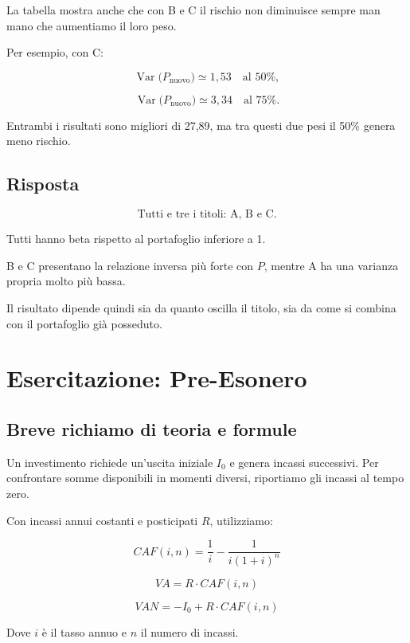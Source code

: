 \medskip

\noindent La tabella mostra anche
che con B e C il rischio
non diminuisce sempre
man mano che aumentiamo il loro peso.

\noindent Per esempio, con C:

\[
\operatorname{Var}\bigl(P_{\text{nuovo}}\bigr)
\simeq1{,}53
\quad\text{al }50\%,
\]

\[
\operatorname{Var}\bigl(P_{\text{nuovo}}\bigr)
\simeq3{,}34
\quad\text{al }75\%.
\]

\noindent Entrambi i risultati
sono migliori di 27,89,
ma tra questi due pesi
il 50\% genera meno rischio.


\subsection*{Risposta}

\[
\boxed{
\text{Tutti e tre i titoli: A, B e C.}
}
\]

\noindent Tutti hanno beta rispetto al portafoglio
inferiore a 1.

\noindent B e C presentano
la relazione inversa più forte con $P$,
mentre A ha una varianza propria
molto più bassa.

\noindent Il risultato dipende quindi
sia da quanto oscilla il titolo,
sia da come si combina
con il portafoglio già posseduto.
\newpage

\section{Esercitazione: Pre-Esonero}

\subsection*{Breve richiamo di teoria e formule}

Un investimento richiede un'uscita iniziale $I_0$ e genera
incassi successivi. Per confrontare somme disponibili
in momenti diversi, riportiamo gli incassi al tempo zero.

\noindent Con incassi annui costanti e posticipati $R$, utilizziamo:

\[
    CAF(i,n)
    =
    \frac{1}{i}-\frac{1}{i(1+i)^n}
\]

\[
    VA=R\cdot CAF(i,n)
\]

\[
    VAN=-I_0+R\cdot CAF(i,n)
\]

\noindent Dove $i$ è il tasso annuo e $n$ il numero di incassi.

